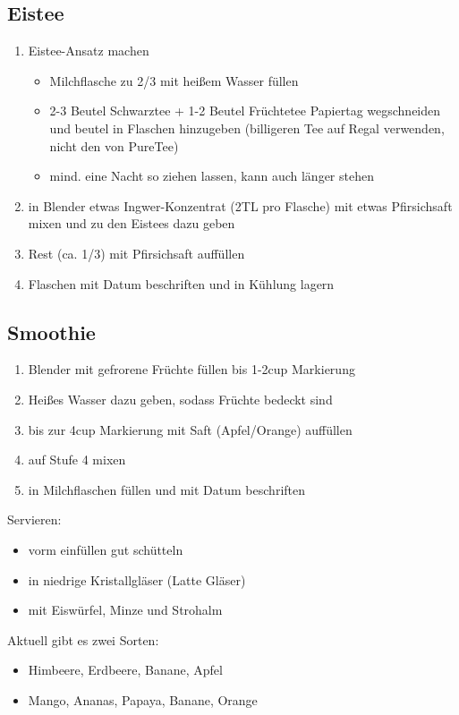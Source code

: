 \documentclass[a4paper,12pt]{article}
\begin{document}
\subsection{Eistee}\label{subsec:eistee}

\begin{enumerate}[topsep=0pt, itemsep=1pt]
    \item Eistee-Ansatz machen
    \begin{itemize}[topsep=0pt, itemsep=1pt]
        \item[-] Milchflasche zu 2/3 mit heißem Wasser füllen
        \item[-] 2-3 Beutel Schwarztee + 1-2 Beutel Früchtetee Papiertag wegschneiden und beutel in Flaschen hinzugeben (billigeren Tee auf Regal verwenden, nicht den von PureTee)
        \item[-] mind. eine Nacht so ziehen lassen, kann auch länger stehen
    \end{itemize}
    \item in Blender etwas Ingwer-Konzentrat (2TL pro Flasche) mit etwas Pfirsichsaft mixen und zu den Eistees dazu geben
    \item Rest (ca. 1/3) mit Pfirsichsaft auffüllen
    \item Flaschen mit Datum beschriften und in Kühlung lagern
\end{enumerate}

\subsection{Smoothie}\label{subsec:smoothie}
\begin{enumerate}[topsep=0pt, itemsep=0pt, leftmargin=1em]
    \item Blender mit gefrorene Früchte füllen bis 1-2cup Markierung
    \item Heißes Wasser dazu geben, sodass Früchte bedeckt sind
    \item bis zur 4cup Markierung mit Saft (Apfel/Orange) auffüllen
    \item auf Stufe 4 mixen
    \item in Milchflaschen füllen und mit Datum beschriften
\end{enumerate}
\vspace{1em}
Servieren:
\begin{itemize}[topsep=0pt, itemsep=0pt, leftmargin=1em]
    \item[-] vorm einfüllen gut schütteln
    \item[-] in niedrige Kristallgläser (Latte Gläser)
    \item[-] mit Eiswürfel, Minze und Strohalm
\end{itemize}
\vspace{1em}
Aktuell gibt es zwei Sorten:
\begin{itemize}[topsep=0pt, itemsep=0pt, leftmargin=1em]
    \item[-] Himbeere, Erdbeere, Banane, Apfel
    \item[-] Mango, Ananas, Papaya, Banane, Orange 
\end{itemize}
\end{document}
